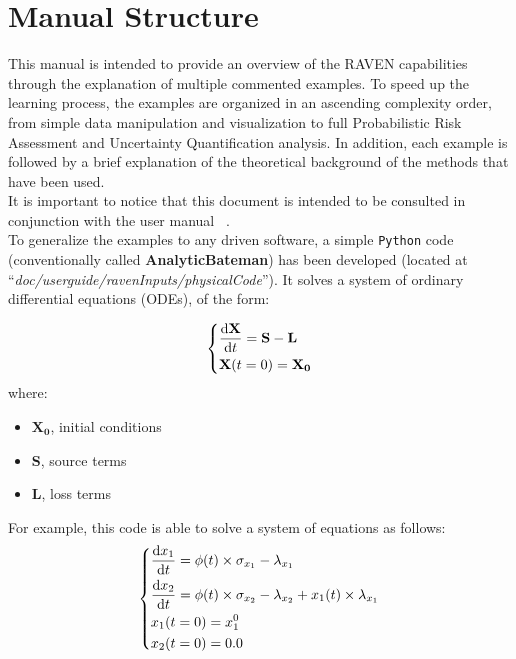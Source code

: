\section{Manual Structure}
This manual is intended to provide an overview of the RAVEN capabilities through the explanation of multiple commented examples. 
To speed up the learning process, the examples are organized in an ascending complexity order, from simple data manipulation and visualization to
full Probabilistic Risk Assessment and Uncertainty Quantification analysis. In addition, each example is followed by a brief explanation of the theoretical background of the methods that have been used.
\\ It is important to notice that this document is intended to be consulted in conjunction with the user manual ~\cite{RAVENuserManual}.
\\To generalize the examples to any driven software, a simple \texttt{Python} code (conventionally called \textbf{AnalyticBateman}) has been developed (located at ``\textit{doc/user\textunderscore guide/ravenInputs/physicalCode}''). It solves a system of ordinary differential equations (ODEs), of the form:

\begin{equation}
\begin{dcases}
\frac{\mathrm{d} \mathbf{X}}{\mathrm{d} t} = \mathbf{S}-\mathbf{L} \\
 \mathbf{X}(t=0)= \mathbf{X_{0}}
\end{dcases}
\end{equation}
   where: 
  \begin{itemize}
     \item $\mathbf{X_{0}}$, initial conditions     
     \item $\mathbf{S}$, source terms 
     \item $\mathbf{L}$, loss terms
   \end{itemize}  

For example, this  code is able to solve a system of equations as follows:
\begin{equation}
  \begin{dcases}
   \frac{\mathrm{d} x_{1}}{\mathrm{d} t} = \phi (t)\times \sigma_{x_{1}}-\lambda_{x_{1}} \\
   \frac{\mathrm{d} x_{2}}{\mathrm{d} t} = \phi (t)\times \sigma_{x_{2}}-\lambda_{x_{2}}+x_{1}(t)\times\lambda_{x_{1}} \\
    x_{1}(t=0)= x_{1}^{0} \\
    x_{2}(t=0)= 0.0
  \end{dcases}
\end{equation}

